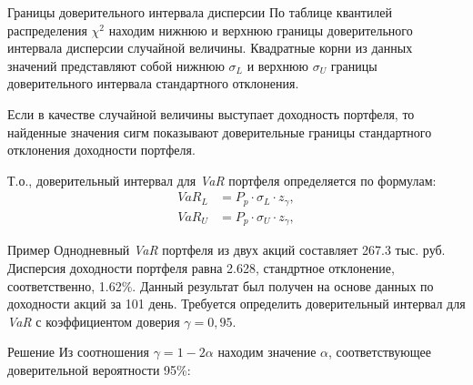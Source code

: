 \documentclass[_fin_decisions_lectures.tex]{subfiles}
\begin{document}
\begin{frame}[ allowframebreaks ]{Границы доверительного интервала дисперсии}
По таблице квантилей распределения $\chi^2$ находим нижнюю и верхнюю границы доверительного интервала дисперсии случайной величины. Квадратные корни из данных значений представляют собой нижнюю $\sigma_L$  и верхнюю $\sigma_U$ границы доверительного интервала стандартного отклонения.

\pagebreak
Если в качестве случайной величины выступает доходность портфеля, то найденные значения сигм показывают доверительные границы стандартного отклонения доходности портфеля.

\pagebreak
Т.о., доверительный интервал для \textit{VaR} портфеля определяется по формулам:
\begin{align}
VaR_L &=P_p \cdot \sigma_L \cdot z_{\gamma},\\
VaR_U &=P_p \cdot \sigma_U \cdot z_{\gamma},
\end{align}

\end{frame}

\begin{frame}
\begin{exampleblock}{Пример}
Однодневный \textit{VaR }портфеля из двух акций составляет 267.3 тыс. руб. Дисперсия доходности портфеля равна 2.628, стандртное отклонение, соответственно, 1.62\%. Данный результат был получен на основе данных по доходности акций за 101 день. Требуется определить доверительный интервал для \textit{VaR }с коэффициентом доверия $\gamma = 0,95$.
\end{exampleblock}
\end{frame}

\begin{frame}[shrink=10]
\begin{exampleblock}{Решение}
Из соотношения $\gamma=1-2\alpha$ находим значение $\alpha$, соответствующее доверительной вероятности 95\%:

\end{exampleblock}
\end{frame}
\end{document}
